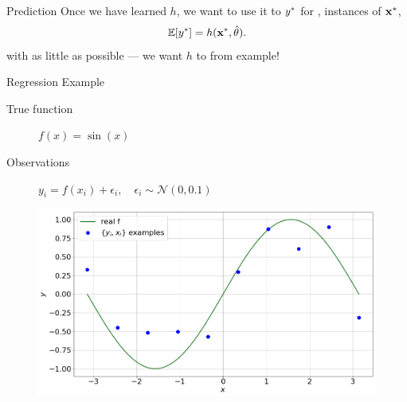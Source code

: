 \documentclass[lualatex, aspectratio=169]{beamer}
\begin{document}
\begin{frame}{Prediction}
  Once we have learned $h$, we want to use it to  ${y}^{*}$ for ,  instances of ${\mathbf{x}}^{*}$,
  \begin{align*}
    \mathbb{E}\!\left[{{y}^{*}}\right] = h({\mathbf{x}}^{*}, \hat{\theta}).
  \end{align*}
  with as little  as possible --- we want $h$ to  from example!
\end{frame}


\begin{frame}{Regression Example}

  \begin{description}
    \item[True function] $f(x) = \sin(x)$
    \item[Observations] $y_i = f(x_i) + \epsilon_i, \quad \epsilon_i \sim \mathcal{N}(0, 0.1)$
  \end{description}

  \begin{figure}
    \includegraphics[width=0.5\pagewidth]{assets/regress.png}
  \end{figure}

\end{frame}
\end{document}
